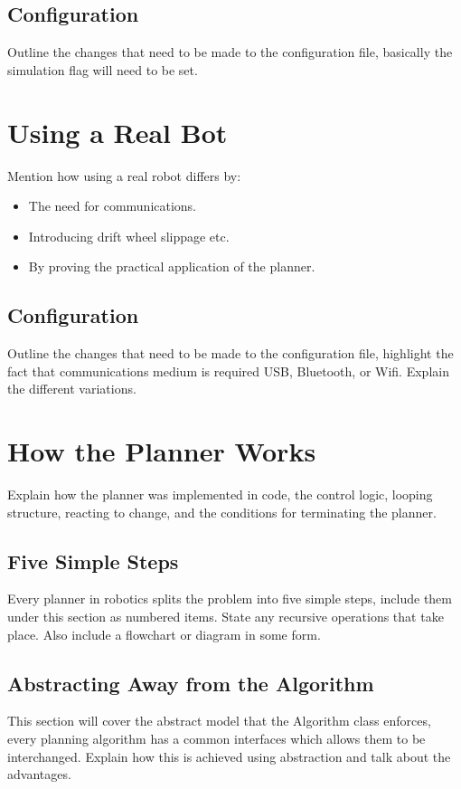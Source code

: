 \subsection{Configuration}
Outline the changes that need to be made to the configuration file, basically the simulation flag will need to be set.


\section{Using a Real Bot}
Mention how using a real robot differs by:

\begin{itemize}
\item The need for communications.
\item Introducing drift wheel slippage etc.
\item By proving the practical application of the planner.
\end{itemize}

\subsection{Configuration}
Outline the changes that need to be made to the configuration file, highlight the fact that communications medium is required USB, Bluetooth, or Wifi. Explain the different variations.


\section{How the Planner Works}
Explain how the planner was implemented in code, the control logic, looping structure, reacting to change, and the conditions for terminating the planner.

\subsection{Five Simple Steps}
Every planner in robotics splits the problem into five simple steps, include them under this section as numbered items. State any recursive operations that take place. Also include a flowchart or diagram in some form.

\subsection{Abstracting Away from the Algorithm}
This section will cover the abstract model that the Algorithm class enforces, every planning algorithm has a common interfaces which allows them to be interchanged. Explain how this is achieved using abstraction and talk about the advantages.


